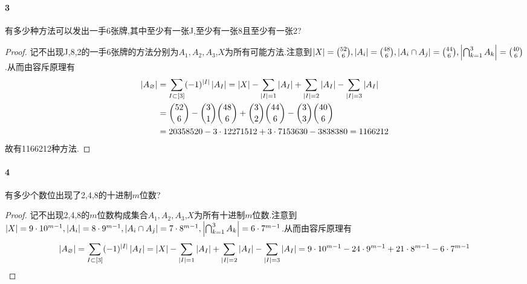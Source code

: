 \documentclass[11pt]{article}
\begin{document}
\paragraph{3}有多少种方法可以发出一手6张牌,其中至少有一张J,至少有一张8且至少有一张2?
\begin{proof}
    记不出现J,8,2的一手6张牌的方法分别为$A_1,A_2,A_3$,$X$为所有可能方法.注意到$\left|X\right|=\binom{52}{6},\left|A_i\right|=\binom{48}{6},\left|A_i\cap A_j\right|=\binom{44}{6},\left|\bigcap_{k=1}^3 A_k\right|=\binom{40}{6}$.从而由容斥原理有
    $$\begin{aligned}
        \left|A_\varnothing\right|&=\sum_{I\subset [3]}(-1)^{\left|I\right|}\left|A_I\right|=\left|X\right|-\sum_{\left|I\right|=1}\left|A_I\right|+\sum_{\left|I\right|=2}\left|A_I\right|-\sum_{\left|I\right|=3}\left|A_I\right|\\
        &=\binom{52}{6} - \binom{3}{1}\binom{48}{6} +\binom{3}{2}\binom{44}{6}-\binom{3}{3}\binom{40}{6}\\
        &=20358520-3\cdot 12271512+3\cdot 7153630-3838380=1166212
    \end{aligned}$$
    故有1166212种方法.
\end{proof}

\paragraph{4}有多少个数位出现了2,4,8的十进制$m$位数?
\begin{proof}
    记不出现2,4,8的$m$位数构成集合$A_1,A_2,A_3$,$X$为所有十进制$m$位数.注意到$\left|X\right|=9\cdot 10^{m-1},\left|A_i\right|=8\cdot 9^{m-1},\left|A_i\cap A_j\right|=7\cdot 8^{m-1},\left|\bigcap_{k=1}^3 A_k\right|=6\cdot 7^{m-1}$.从而由容斥原理有
    $$\left|A_\varnothing\right|=\sum_{I\subset [3]}(-1)^{\left|I\right|}\left|A_I\right|=\left|X\right|-\sum_{\left|I\right|=1}\left|A_I\right|+\sum_{\left|I\right|=2}\left|A_I\right|-\sum_{\left|I\right|=3}\left|A_I\right|=9\cdot 10^{m-1}-24\cdot 9^{m-1} +21\cdot 8^{m-1}-6\cdot 7^{m-1}$$
\end{proof}
\end{document}
